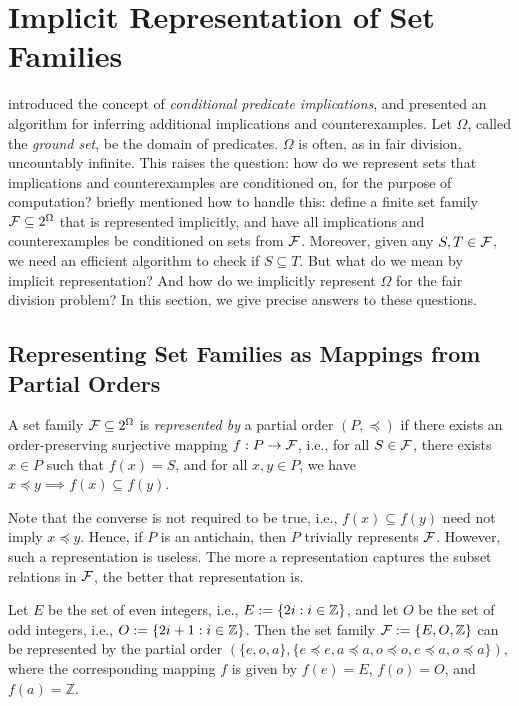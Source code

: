 \section{Implicit Representation of Set Families}
\label{sec:fd-set-family}

 introduced the concept of \emph{conditional predicate implications},
and presented an algorithm for inferring additional implications and counterexamples.
Let $\Omega$, called the \emph{ground set}, be the domain of predicates.
$\Omega$ is often, as in fair division, uncountably infinite.
This raises the question: how do we represent sets that implications and counterexamples
are conditioned on, for the purpose of computation?
 briefly mentioned how to handle this:
define a finite set family $\mathcal{F} \subseteq 2^{\Omega}$ that is represented implicitly,
and have all implications and counterexamples be conditioned on sets from $\mathcal{F}$.
Moreover, given any $S, T \in \mathcal{F}$, we need an efficient algorithm to
check if $S \subseteq T$.
But what do we mean by implicit representation?
And how do we implicitly represent $\Omega$ for the fair division problem?
In this section, we give precise answers to these questions.

\subsection{Representing Set Families as Mappings from Partial Orders}

\begin{definition}
\label{defn:set-family-repr}
A set family $\mathcal{F} \subseteq 2^{\Omega}$ is \emph{represented by} a partial order $(P, \preceq)$
if there exists an order-preserving surjective mapping $f: P \to \mathcal{F}$,
i.e., for all $S \in \mathcal{F}$, there exists $x \in P$ such that $f(x) = S$,
and for all $x, y \in P$, we have $x \preceq y \implies f(x) \subseteq f(y)$.
\end{definition}

Note that the converse is not required to be true, i.e.,
$f(x) \subseteq f(y)$ need not imply $x \preceq y$.
Hence, if $P$ is an antichain, then $P$ trivially represents $\mathcal{F}$.
However, such a representation is useless.
The more a representation captures the subset relations in $\mathcal{F}$,
the better that representation is.

\begin{example}
Let $E$ be the set of even integers, i.e., $E := \{2i: i \in \mathbb{Z}\}$,
and let $O$ be the set of odd integers, i.e., $O := \{2i+1: i \in \mathbb{Z}\}$.
Then the set family $\mathcal{F} := \{E, O, \mathbb{Z}\}$ can be represented by
the partial order $(\{e, o, a\}, \{e \preceq e, a \preceq a, o \preceq o, e \preceq a, o \preceq a\})$,
where the corresponding mapping $f$ is given by $f(e) = E$, $f(o) = O$, and $f(a) = \mathbb{Z}$.
\end{example}

